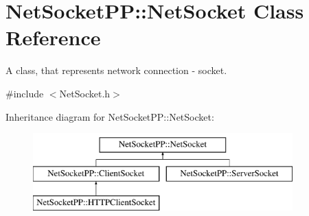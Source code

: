 \hypertarget{class_net_socket_p_p_1_1_net_socket}{\section{Net\-Socket\-P\-P\-:\-:Net\-Socket Class Reference}
\label{class_net_socket_p_p_1_1_net_socket}
}


A class, that represents network connection -\/ socket.  




{\ttfamily \#include $<$Net\-Socket.\-h$>$}

Inheritance diagram for Net\-Socket\-P\-P\-:\-:Net\-Socket\-:\begin{figure}[H]
\begin{center}
\leavevmode
\includegraphics[height=3.000000cm]{class_net_socket_p_p_1_1_net_socket}
\end{center}
\end{figure}
